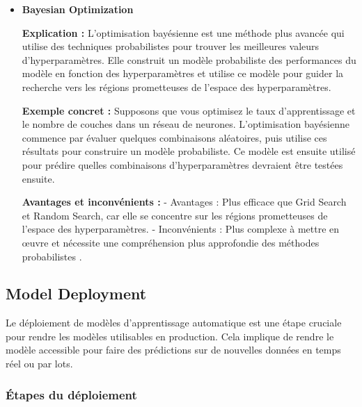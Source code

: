 \documentclass[10pt,a4paper]{article}
\begin{document}
\begin{itemize}
    \item \textbf{Bayesian Optimization}

    \textbf{Explication :}
    L'optimisation bayésienne est une méthode plus avancée qui utilise des techniques probabilistes pour trouver les meilleures valeurs d'hyperparamètres. Elle construit un modèle probabiliste des performances du modèle en fonction des hyperparamètres et utilise ce modèle pour guider la recherche vers les régions prometteuses de l'espace des hyperparamètres.

    \textbf{Exemple concret :}
    Supposons que vous optimisez le taux d'apprentissage et le nombre de couches dans un réseau de neurones. L'optimisation bayésienne commence par évaluer quelques combinaisons aléatoires, puis utilise ces résultats pour construire un modèle probabiliste. Ce modèle est ensuite utilisé pour prédire quelles combinaisons d'hyperparamètres devraient être testées ensuite.

    \textbf{Avantages et inconvénients :}
    - Avantages : Plus efficace que Grid Search et Random Search, car elle se concentre sur les régions prometteuses de l'espace des hyperparamètres.
    - Inconvénients : Plus complexe à mettre en œuvre et nécessite une compréhension plus approfondie des méthodes probabilistes \cite{hyperparameter_tuning}.
\end{itemize}


\subsection*{Model Deployment}

Le déploiement de modèles d'apprentissage automatique est une étape cruciale pour rendre les modèles utilisables en production. Cela implique de rendre le modèle accessible pour faire des prédictions sur de nouvelles données en temps réel ou par lots.

\subsubsection*{Étapes du déploiement}
\end{document}
